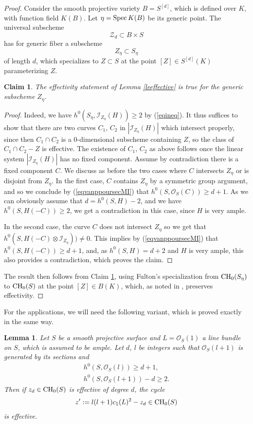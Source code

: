 \documentclass[10pt]{article}
\newtheorem{claim}[theo]{Claim}
\newtheorem{lemm}[theo]{Lemma}
\begin{document}
\begin{proof} Consider the smooth projective variety $B=S^{[d]}$, which is defined over $K$, with function field
$K(B)$. Let $\eta={\rm Spec}\,K(B)$ be its generic point. The universal subscheme
$$\mathcal{Z}_d\subset B\times S$$
has for generic fiber a subscheme
$${Z}_\eta\subset S_\eta$$
of length $d$, which specializes to $Z\subset S$ at the point $[Z]\in S^{[d]}(K)$ parameterizing $Z$.

\begin{claim} \label{claim1802} The effectivity statement of Lemma \ref{leeffective} is true for the generic subscheme ${Z}_\eta $.
\end{claim}
\begin{proof} Indeed, we have $h^0(S_\eta,\mathcal{I}_{Z_\eta}(H))\geq 2$ by (\ref{eqineq}). It thus suffices to show that there are two curves $C_1,\,C_2$ in
$|\mathcal{I}_{Z_\eta}(H)|$ which intersect properly, since then $C_1\cap C_2$ is a $0$-dimensional subscheme containing $Z$, so the class of $C_1\cap C_2- Z$ is effective. The existence of $C_1,\,C_2$ as above follows once the linear system  $|\mathcal{I}_{Z_\eta}(H)|$ has no fixed component. Assume by contradiction there is a fixed component  $C$. We discuss as before the two cases where  $C$ intersects $Z_\eta$ or is disjoint from $Z_\eta$.
In the first case,  $C$ contains $Z_\eta$ by a symmetric group argument, and so we conclude by (\ref{eqvanppoursecMI}) that $h^0(S,\mathcal{O}_S(C))\geq d+1$. As we can obviously assume that $d= h^0(S,H)-2$, and we have $h^0(S,H(-C))\geq 2$, we get a contradiction in this case, since $H$ is very ample.

In the second case, the curve $C$ does not intersect $Z_\eta$ so we get that $h^0(S,H(-C)\otimes \mathcal{I}_{Z_\eta}))\not=0$. This implies by (\ref{eqvanppoursecMI}) that $h^0(S,H(-C))\geq d+1$, and, as $h^0(S,H) =d+2$ and $H$ is very ample, this also provides a contradiction, which proves the claim.
 \end{proof}
The result then follows from  Claim \ref{claim1802}, using  Fulton's specialization   from ${\rm CH}_0(S_\eta)$ to ${\rm CH}_0(S)$ at the point $[Z]\in B(K)$, which, as noted in \cite{colliot}, preserves effectivity.
\end{proof}
For the applications, we will need the following variant, which is proved exactly in the same way.
\begin{lemm}\label{levariant} Let $S$ be a smooth projective surface and $L=\mathcal{O}_S(1)$ a line bundle on $S$, which is assumed to be  ample. Let $d$,  $l$ be integers such that  $\mathcal{O}_S(l+1)$ is generated by its sections and
\begin{eqnarray}\label{eq1levar} h^0(S,\mathcal{O}_S(l))\geq d+1,\\
\label{eq1levar2} h^0(S,\mathcal{O}_S(l+1))-d\geq 2.\end{eqnarray}
Then if $z_d\in {\rm CH}_0(S)$ is effective of degree $d$, the cycle
$$z':=l(l+1) c_1(L)^2-z_d\in {\rm CH}_0(S)$$
is effective.
\end{lemm}
\end{document}
